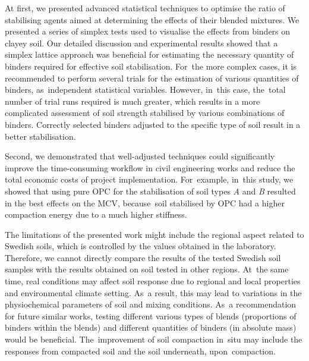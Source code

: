 \documentclass[electronics,article,accept,pdftex,moreauthors]{Definitions/mdpi}
\begin{document}
{At first, we presented} advanced statistical techniques{ }to optimise the ratio of {stabilising agents} aimed at determining the effects of their blended mixtures. {We} presented a series of simplex tests used to visualise{ }the effects from {binders} on clayey soil. {Our detailed discussion and experimental results showed that a simplex lattice approach} was beneficial for{ estimating the necessary }quantity of{ }binders {required for effective soil stabilisation}. For~{the} more complex cases, it is recommended to perform several {trials} for the estimation of various quantities of binders, as~independent statistical variables. However, in~this case, the~total number of trial runs required is much greater{, }which results in a more complicated{ }assessment {of} soil strength stabilised by various{ combinations of} binders. Correctly selected binders{ }adjusted to the specific type of soil{ }result in a better {stabilisation.}

{Second, we demonstrated that} well-adjusted techniques could significantly improve {the} time-consuming workflow{ in civil engineering works }and reduce the {total} economic costs of project implementation. For~example, in~{this} study, {we showed that }using pure OPC for the stabilisation of soil types \emph{A} and \emph{B} resulted in the best effects on {the }MCV{, because~}soil stabilised by OPC {had} a higher compaction energy due to a much higher{ }stiffness. 
	
The limitations of the presented work {might} include the {regional aspect related to Swedish soils}, which is {controlled by} the values obtained in the laboratory. Therefore, we cannot directly compare the results of the tested {Swedish} soil {samples} with {the results} obtained on soil tested in {other regions}. At~the same time, real conditions may affect soil response due to regional and local properties and environmental climate setting. As~a result, this may lead to variations in the {physiochemical} parameters of soil and mixing conditions. As~a recommendation for future similar works, testing different various types of blends (proportions of binders within the blends) and different quantities of binders (in absolute mass{) }would be beneficial. The~improvement of soil compaction in~situ {may }include {the} responses from compacted soil and the soil underneath, upon~compaction. 

\end{document}
